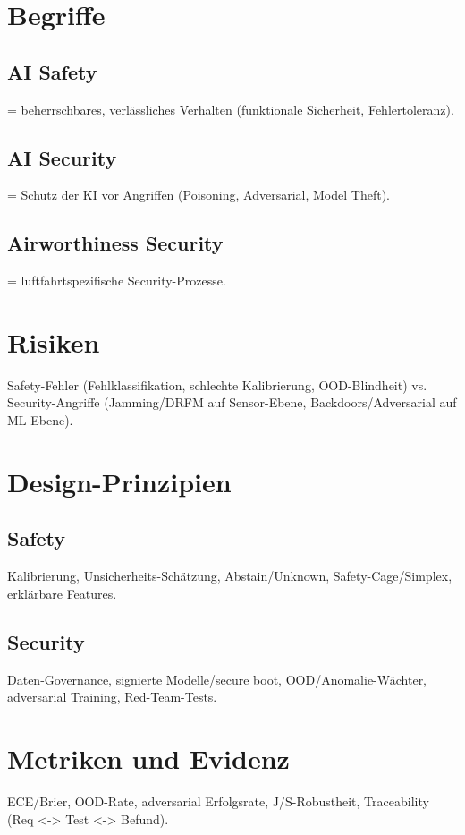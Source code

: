 \section{Begriffe} 

\subsection{AI Safety}
= beherrschbares, verlässliches Verhalten (funktionale Sicherheit, Fehlertoleranz).

\subsection{AI Security}
= Schutz der KI vor Angriffen (Poisoning, Adversarial, Model Theft).

\subsection{Airworthiness Security}
= luftfahrtspezifische Security-Prozesse.




\section{Risiken}
Safety-Fehler (Fehlklassifikation, schlechte Kalibrierung, OOD-Blindheit) 
vs. Security-Angriffe (Jamming/DRFM auf Sensor-Ebene, Backdoors/Adversarial auf ML-Ebene).

\section{Design-Prinzipien}
\subsection{Safety}
Kalibrierung, Unsicherheits-Schätzung, Abstain/Unknown, Safety-Cage/Simplex, erklärbare Features.

\subsection{Security}
Daten-Governance, signierte Modelle/secure boot, OOD/Anomalie-Wächter, adversarial Training, Red-Team-Tests.

\section{Metriken und Evidenz}
ECE/Brier, OOD-Rate, adversarial Erfolgsrate, J/S-Robustheit, Traceability (Req <-> Test <-> Befund).












